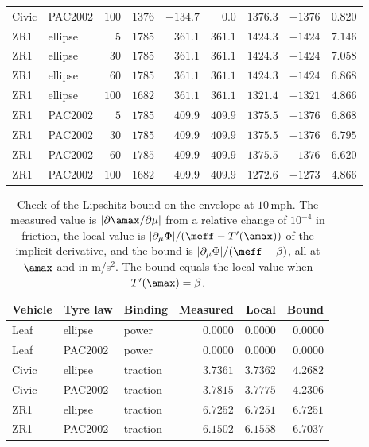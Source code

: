 \begin{table}[htbp]
\begin{tabular}{llrrrrrrr}
Civic & PAC2002 & $100$ & $1376$ & $-134.7$ & $0.0$ & $1376.3$ & $-1376$ & $0.820$\\
ZR1 & ellipse & $5$ & $1785$ & $361.1$ & $361.1$ & $1424.3$ & $-1424$ & $7.146$\\
ZR1 & ellipse & $30$ & $1785$ & $361.1$ & $361.1$ & $1424.3$ & $-1424$ & $7.058$\\
ZR1 & ellipse & $60$ & $1785$ & $361.1$ & $361.1$ & $1424.3$ & $-1424$ & $6.868$\\
ZR1 & ellipse & $100$ & $1682$ & $361.1$ & $361.1$ & $1321.4$ & $-1321$ & $4.866$\\
ZR1 & PAC2002 & $5$ & $1785$ & $409.9$ & $409.9$ & $1375.5$ & $-1376$ & $6.868$\\
ZR1 & PAC2002 & $30$ & $1785$ & $409.9$ & $409.9$ & $1375.5$ & $-1376$ & $6.795$\\
ZR1 & PAC2002 & $60$ & $1785$ & $409.9$ & $409.9$ & $1375.5$ & $-1376$ & $6.620$\\
ZR1 & PAC2002 & $100$ & $1682$ & $409.9$ & $409.9$ & $1272.6$ & $-1273$ & $4.866$\\
\bottomrule
\end{tabular}
\end{table}

\begin{table}[htbp]
\centering\small
\caption{Check of the Lipschitz bound on the envelope at $10$\,mph. The measured value is $|\partial\amax/\partial\mu|$ from a relative change of $10^{-4}$ in friction, the local value is $|\partial_\mu\Phi|/(\meff-T'(\amax))$ of the implicit derivative, and the bound is $|\partial_\mu\Phi|/(\meff-\beta)$, all at $\amax$ and in m/s$^2$. The bound equals the local value when $T'(\amax)=\beta$.}\label{tab:app-lipschitz}
\begin{tabular}{lllrrr}
\toprule
Vehicle & Tyre law & Binding & Measured & Local & Bound\\
\midrule
Leaf & ellipse & power & $0.0000$ & $0.0000$ & $0.0000$\\
Leaf & PAC2002 & power & $0.0000$ & $0.0000$ & $0.0000$\\
Civic & ellipse & traction & $3.7361$ & $3.7362$ & $4.2682$\\
Civic & PAC2002 & traction & $3.7815$ & $3.7775$ & $4.2306$\\
ZR1 & ellipse & traction & $6.7252$ & $6.7251$ & $6.7251$\\
ZR1 & PAC2002 & traction & $6.1502$ & $6.1558$ & $6.7037$\\
\bottomrule
\end{tabular}
\end{table}
